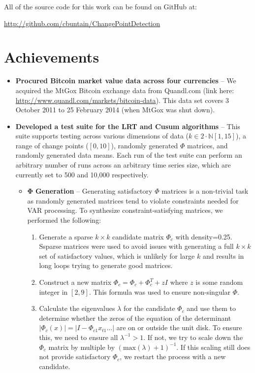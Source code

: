 \documentclass[10pt,letterpaper]{article}
\begin{document}
\maketitle

All of the source code for this work can be found on GitHub at:

\url{http://github.com/cbuntain/ChangePointDetection}

\section{Achievements}

\begin{itemize}
\item \textbf{Procured Bitcoin market value data across four currencies} -- We acquired the MtGox Bitcoin exchange data from Quandl.com (link here: \url{http://www.quandl.com/markets/bitcoin-data}). This data set covers 3 October 2011 to 25 February 2014 (when MtGox was shut down).
\item \textbf{Developed a test suite for the LRT and Cusum algorithms} -- This suite supports testing across various dimensions of data ($k \in 2\cdot \mathbb{N}[1, 15]$), a range of change points ($[0, 10]$), randomly generated $\Phi$ matrices, and randomly generated data means. Each run of the test suite can perform an arbitrary number of runs across an arbitrary time series size, which are currently set to 500 and 10,000 respectively.
\begin{itemize}
\item $\mathbf{\Phi}$ \textbf{Generation} -- Generating satisfactory $\Phi$ matrices is a non-trivial task as randomly generated matrices tend to violate constraints needed for VAR processing. To synthesize constraint-satisfying matrices, we performed the following:

\begin{enumerate}
\item Generate a sparse $k \times k$ candidate matrix $\Phi_c$ with density=0.25. Ssparse matrices were used to avoid issues with generating a full $k \times k$ set of satisfactory values, which is unlikely for large $k$ and results in long loops trying to generate good matrices.
\item Construct a new matrix $\Phi_c = \Phi_c + \Phi_c^T + zI$ where $z$ is some random integer in $[2, 9]$. This formula was used to ensure non-singular $\Phi$.
\item Calculate the eigenvalues $\lambda$ for the candidate $\Phi_c$ and use them to determine whether the zeros of the equation of the determinant $|\Phi_c(x)| = |I - \Phi_{c1}x_{t1} ...|$ are on or outside the unit disk. To ensure this, we need to ensure all $\lambda^{-1} > 1$. If not, we try to scale down the $\Phi_c$ matrix by multiple by $(\text{max}(\lambda)+1)^{-1}$. If this scaling still does not provide satisfactory $\Phi_c$, we restart the process with a new candidate.
\end{enumerate}


\end{itemize}
\end{itemize}
\end{document}
